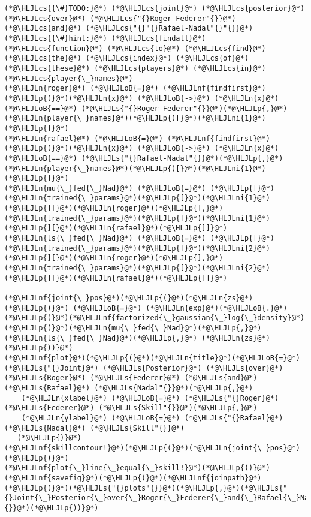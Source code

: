 \documentclass[12pt,a4paper]{article}
\newcommand{\HLJLn}[1]{#1}
\newcommand{\HLJLnf}[1]{\textcolor[RGB]{66,102,213}{#1}}
\newcommand{\HLJLs}[1]{\textcolor[RGB]{201,61,57}{#1}}
\newcommand{\HLJLni}[1]{\textcolor[RGB]{59,151,46}{#1}}
\newcommand{\HLJLoB}[1]{\textcolor[RGB]{102,102,102}{\textbf{#1}}}
\newcommand{\HLJLp}[1]{#1}
\newcommand{\HLJLcs}[1]{\textcolor[RGB]{153,153,119}{\textit{#1}}}
\begin{document}
\begin{lstlisting}
(*@\HLJLcs{{\#}TODO:}@*) (*@\HLJLcs{joint}@*) (*@\HLJLcs{posterior}@*) (*@\HLJLcs{over}@*) (*@\HLJLcs{"{}Roger-Federer"{}}@*) (*@\HLJLcs{and}@*) (*@\HLJLcs{"{}"{}Rafael-Nadal"{}"{}}@*)
(*@\HLJLcs{{\#}hint:}@*) (*@\HLJLcs{findall}@*) (*@\HLJLcs{function}@*) (*@\HLJLcs{to}@*) (*@\HLJLcs{find}@*) (*@\HLJLcs{the}@*) (*@\HLJLcs{index}@*) (*@\HLJLcs{of}@*) (*@\HLJLcs{these}@*) (*@\HLJLcs{players}@*) (*@\HLJLcs{in}@*) (*@\HLJLcs{player{\_}names}@*)
(*@\HLJLn{roger}@*) (*@\HLJLoB{=}@*) (*@\HLJLnf{findfirst}@*)(*@\HLJLp{(}@*)(*@\HLJLn{x}@*) (*@\HLJLoB{->}@*) (*@\HLJLn{x}@*) (*@\HLJLoB{==}@*) (*@\HLJLs{"{}Roger-Federer"{}}@*)(*@\HLJLp{,}@*) (*@\HLJLn{player{\_}names}@*)(*@\HLJLp{)[}@*)(*@\HLJLni{1}@*)(*@\HLJLp{]}@*)
(*@\HLJLn{rafael}@*) (*@\HLJLoB{=}@*) (*@\HLJLnf{findfirst}@*)(*@\HLJLp{(}@*)(*@\HLJLn{x}@*) (*@\HLJLoB{->}@*) (*@\HLJLn{x}@*) (*@\HLJLoB{==}@*) (*@\HLJLs{"{}Rafael-Nadal"{}}@*)(*@\HLJLp{,}@*) (*@\HLJLn{player{\_}names}@*)(*@\HLJLp{)[}@*)(*@\HLJLni{1}@*)(*@\HLJLp{]}@*)
(*@\HLJLn{mu{\_}fed{\_}Nad}@*) (*@\HLJLoB{=}@*) (*@\HLJLp{[}@*)(*@\HLJLn{trained{\_}params}@*)(*@\HLJLp{[}@*)(*@\HLJLni{1}@*)(*@\HLJLp{][}@*)(*@\HLJLn{roger}@*)(*@\HLJLp{],}@*) (*@\HLJLn{trained{\_}params}@*)(*@\HLJLp{[}@*)(*@\HLJLni{1}@*)(*@\HLJLp{][}@*)(*@\HLJLn{rafael}@*)(*@\HLJLp{]]}@*)
(*@\HLJLn{ls{\_}fed{\_}Nad}@*) (*@\HLJLoB{=}@*) (*@\HLJLp{[}@*)(*@\HLJLn{trained{\_}params}@*)(*@\HLJLp{[}@*)(*@\HLJLni{2}@*)(*@\HLJLp{][}@*)(*@\HLJLn{roger}@*)(*@\HLJLp{],}@*) (*@\HLJLn{trained{\_}params}@*)(*@\HLJLp{[}@*)(*@\HLJLni{2}@*)(*@\HLJLp{][}@*)(*@\HLJLn{rafael}@*)(*@\HLJLp{]]}@*)

(*@\HLJLnf{joint{\_}pos}@*)(*@\HLJLp{(}@*)(*@\HLJLn{zs}@*)(*@\HLJLp{)}@*) (*@\HLJLoB{=}@*) (*@\HLJLn{exp}@*)(*@\HLJLoB{.}@*)(*@\HLJLp{(}@*)(*@\HLJLnf{factorized{\_}gaussian{\_}log{\_}density}@*)(*@\HLJLp{(}@*)(*@\HLJLn{mu{\_}fed{\_}Nad}@*)(*@\HLJLp{,}@*) (*@\HLJLn{ls{\_}fed{\_}Nad}@*)(*@\HLJLp{,}@*) (*@\HLJLn{zs}@*)(*@\HLJLp{))}@*)
(*@\HLJLnf{plot}@*)(*@\HLJLp{(}@*)(*@\HLJLn{title}@*)(*@\HLJLoB{=}@*)(*@\HLJLs{"{}Joint}@*) (*@\HLJLs{Posterior}@*) (*@\HLJLs{over}@*) (*@\HLJLs{Roger}@*) (*@\HLJLs{Federer}@*) (*@\HLJLs{and}@*) (*@\HLJLs{Rafael}@*) (*@\HLJLs{Nadal"{}}@*)(*@\HLJLp{,}@*)
    (*@\HLJLn{xlabel}@*) (*@\HLJLoB{=}@*) (*@\HLJLs{"{}Roger}@*) (*@\HLJLs{Federer}@*) (*@\HLJLs{Skill"{}}@*)(*@\HLJLp{,}@*)
    (*@\HLJLn{ylabel}@*) (*@\HLJLoB{=}@*) (*@\HLJLs{"{}Rafael}@*) (*@\HLJLs{Nadal}@*) (*@\HLJLs{Skill"{}}@*)
   (*@\HLJLp{)}@*)
(*@\HLJLnf{skillcontour!}@*)(*@\HLJLp{(}@*)(*@\HLJLn{joint{\_}pos}@*)(*@\HLJLp{)}@*)
(*@\HLJLnf{plot{\_}line{\_}equal{\_}skill!}@*)(*@\HLJLp{()}@*)
(*@\HLJLnf{savefig}@*)(*@\HLJLp{(}@*)(*@\HLJLnf{joinpath}@*)(*@\HLJLp{(}@*)(*@\HLJLs{"{}plots"{}}@*)(*@\HLJLp{,}@*)(*@\HLJLs{"{}Joint{\_}Posterior{\_}over{\_}Roger{\_}Federer{\_}and{\_}Rafael{\_}Nadal.pdf"{}}@*)(*@\HLJLp{))}@*)
\end{lstlisting}
\end{document}
